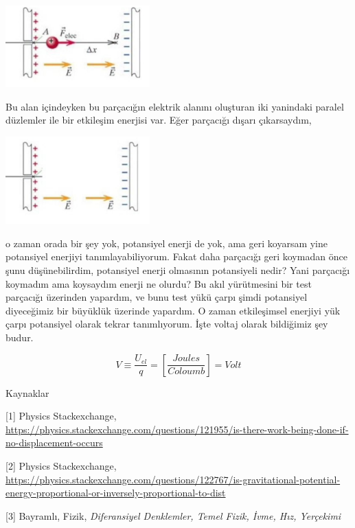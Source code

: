 \documentclass[12pt,fleqn]{article}\usepackage{../../common}
\begin{document}
\includegraphics[width=15em]{08_08.jpg}

Bu alan içindeyken bu parçacığın elektrik alanını oluşturan iki yanindaki
paralel düzlemler ile bir etkileşim enerjisi var. Eğer parçacığı dışarı
çıkarsaydım,

\includegraphics[width=15em]{08_09.jpg}

o zaman orada bir şey yok, potansiyel enerji de yok, ama geri koyarsam yine
potansiyel enerjiyi tanımlayabiliyorum. Fakat daha parçacığı geri koymadan önce
şunu düşünebilirdim, potansiyel enerji olmasının potansiyeli nedir? Yani
parçacığı koymadım ama koysaydım enerji ne olurdu? Bu akıl yürütmesini bir test
parçacığı üzerinden yapardım, ve bunu test yükü çarpı şimdi potansiyel
diyeceğimiz bir büyüklük üzerinde yapardım. O zaman etkileşimsel enerjiyi yük
çarpı potansiyel olarak tekrar tanımlıyorum. İşte voltaj olarak bildiğimiz şey
budur.

$$
V \equiv \frac{U_{el}}{q} = \left[ \frac{Joules}{Coloumb} \right] = Volt
$$

Kaynaklar

[1] Physics Stackexchange, \url{https://physics.stackexchange.com/questions/121955/is-there-work-being-done-if-no-displacement-occurs}

[2] Physics Stackexchange, \url{https://physics.stackexchange.com/questions/122767/is-gravitational-potential-energy-proportional-or-inversely-proportional-to-dist}

[3] Bayramlı, Fizik, {\em Diferansiyel Denklemler, Temel Fizik, İvme, Hız, Yerçekimi}
\end{document}
